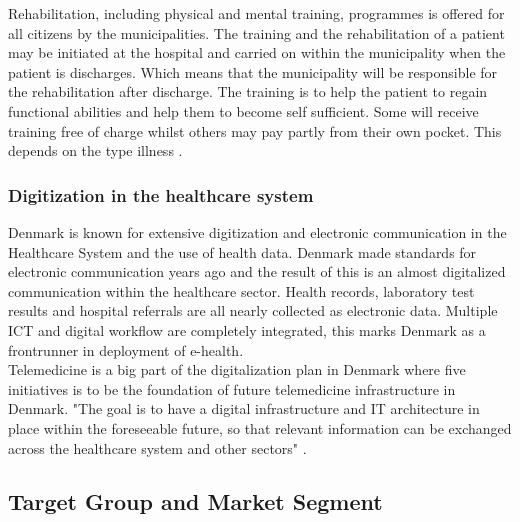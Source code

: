 Rehabilitation, including physical and mental training, programmes is offered for all citizens by the municipalities. The training and the rehabilitation of a patient may be initiated at the hospital and carried on within the municipality when the patient is discharges. Which means that the municipality will be responsible for the rehabilitation after discharge. The training is to help the patient to regain functional abilities and help them to become self sufficient. Some will receive training free of charge whilst others may pay partly from their own pocket. This depends on the type illness \cite{Healthcareindk2}.



\subsubsection{Digitization in the healthcare system}

Denmark is known for extensive digitization and electronic communication in the Healthcare System and the use of health data. Denmark made standards for electronic communication years ago and the result of this is an almost digitalized communication within the healthcare sector. Health records, laboratory test results and hospital referrals are all nearly collected as electronic data. 
Multiple ICT and digital workflow are completely integrated, this marks Denmark as a frontrunner in deployment of e-health.\\
Telemedicine is a big part of the digitalization plan in Denmark where five initiatives is to be the foundation of future telemedicine infrastructure in Denmark. "The goal is to have a digital infrastructure and IT architecture in place within the foreseeable future, so that relevant information can be exchanged across the healthcare system and other sectors" \cite{Healthcareindk2}. 





\subsection{Target Group and Market Segment}

